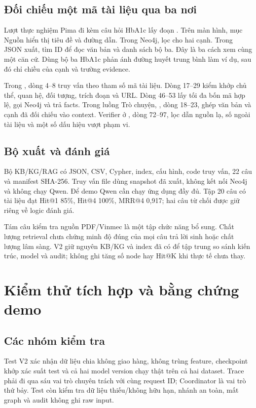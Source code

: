 \section{Đối chiếu một mã tài liệu qua ba nơi}
Lượt thực nghiệm Pima đi kèm câu hỏi HbA1c lấy đoạn . Trên màn hình, mục Nguồn hiển thị tiêu đề và đường dẫn. Trong Neo4j, lọc  cho hai cạnh. Trong JSON xuất, tìm ID  để đọc văn bản và danh sách bộ ba. Đây là ba cách xem cùng một căn cứ. Dùng bộ ba HbA1c phản ánh đường huyết trung bình làm ví dụ, sau đó chỉ chiều của cạnh và trường evidence.

Trong , dòng 4--8 truy vấn theo tham số mã tài liệu. Dòng 17--29 kiểm khớp chủ thể, quan hệ, đối tượng, trích đoạn và URL. Dòng 46--53 lấy tối đa bốn mã hợp lệ, gọi Neo4j và trả facts. Trong luồng Trò chuyện, , dòng 18--23, ghép văn bản và cạnh đã đối chiếu vào context. Verifier ở , dòng 72--97, lọc dẫn nguồn lạ, số ngoài tài liệu và một số dấu hiệu vượt phạm vi.

\section{Bộ xuất và đánh giá}
Bộ KB/KG/RAG có JSON, CSV, Cypher, index, cấu hình, code truy vấn, 22 câu và manifest SHA-256. Truy vấn file dùng snapshot đã xuất, không kết nối Neo4j và không chạy Qwen. Để demo Qwen cần chạy ứng dụng đầy đủ. Tập 20 câu có tài liệu đạt Hit@1 85\%, Hit@4 100\%, MRR@4 0,917; hai câu từ chối được giữ riêng về logic đánh giá.

Tám câu kiểm tra nguồn PDF/Vinmec là một tập chức năng bổ sung. Chất lượng retrieval chưa chứng minh độ đúng của mọi câu trả lời sinh hoặc chất lượng lâm sàng. V2 giữ nguyên KB/KG và index đã có để tập trung so sánh kiến trúc, model và audit; không ghi tăng số node hay Hit@K khi thực tế chưa thay.

\chapter{Kiểm thử tích hợp và bằng chứng demo}\label{pr:checks}
\section{Các nhóm kiểm tra}

Test V2 xác nhận dữ liệu chia không giao hàng, không trùng feature, checkpoint khớp xác suất test và cả hai model version chạy thật trên cả hai dataset. Trace phải đi qua sáu vai trò chuyên trách với cùng request ID; Coordinator là vai trò thứ bảy. Test còn kiểm tra dữ liệu thiếu/không hữu hạn, nhánh an toàn, mất graph và audit không ghi raw input.

